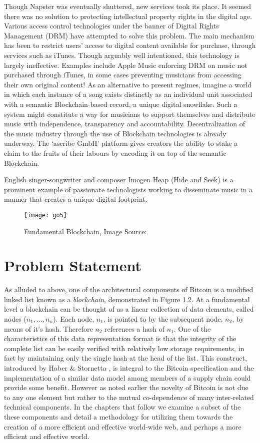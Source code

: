 Though Napster was eventually shuttered, new services took its place. It seemed there was no solution to protecting intellectual property rights in the digital age. 
Various access control technologies under the banner of Digital Rights Management (DRM) have attempted to solve this problem. 
The main mechanism has been to restrict users' access to digital content available for purchase, through services such as iTunes. 
Though arguably well intentioned, this technology is largely ineffective. 
Examples include Apple Music enforcing DRM on music not purchased through iTunes, in some cases preventing musicians from accessing their own original content! 
As an alternative to present regimes, imagine a world in which each instance of a song exists distinctly as an individual unit associated with a semantic Blockchain-based record, a unique digital snowflake. 
Such a system might constitute a way for musicians to support themselves and distribute music with independence, transparency and accountability. 
Decentralization of the music industry through the use of Blockchain technologies is already underway. The `ascribe GmbH' platform gives creators the ability to stake a claim to the fruits of their labours by encoding it on top of the semantic Blockchain.

English singer-songwriter and composer Imogen Heap (Hide and Seek) is a prominent example of passionate technologists working to disseminate music in a manner that creates a unique digital footprint.

\begin{figure}
  \centering
    \texttt{[image: go5]}
  \caption{Fundamental Blockchain, Image Source: \cite{narayanan2016bitcoin}}
\end{figure}

\section{Problem Statement}

As alluded to above, one of the architectural components of Bitcoin is a modified linked list known as a \textit{blockchain}, demonstrated in Figure 1.2.
At a fundamental level a blockchain can be thought of as a linear collection of data elements, called nodes ($n_1, ..., n_n$). 
Each node, $n_1$, is pointed to by the subsequent node, $n_2$, by means of it's hash.
Therefore $n_2$ references a hash of $n_1$. 
One of the characteristics of this data representation format is that the integrity of the complete list can be easily verified with relatively low storage requirements, in fact by maintaining only the single hash at the head of the list.
This construct, introduced by Haber \& Stornetta \cite{haber1990time}, is integral to the Bitcoin specification and the implementation of a similar data model among members of a supply chain could provide some benefit. 
However as noted earlier the novelty of Bitcoin is not due to any one element but rather to the mutual co-dependence of many inter-related technical components.
In the chapters that follow we examine a subset of the these components and detail a methodology for utilizing them towards the creation of a more efficient and effective world-wide web, and perhaps a more efficient and effective world.

